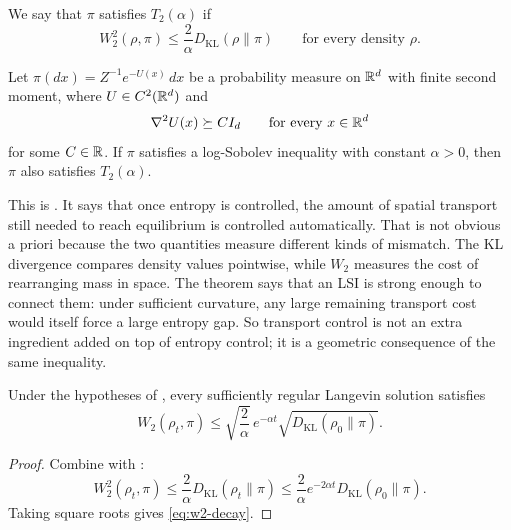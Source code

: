\documentclass[11pt]{article}
\begin{document}
\begin{definition}
\label{def:t2}
We say that $\pi$ satisfies $T_2(\alpha)$ if
\begin{equation}
  W_2^2(\rho,\pi)
  \le
  \frac{2}{\alpha}D_{\mathrm{KL}}(\rho\|\pi)
  \qquad
  \text{for every density }\rho.
  \label{eq:t2}
\end{equation}
\end{definition}

\begin{theorem}
\label{thm:otto-villani}
Let $\pi(dx)=Z^{-1}e^{-U(x)}\,dx$ be a probability measure on $\mathbb{R}^d$ with finite second moment, where $U\in C^2(\mathbb{R}^d)$ and
\[
\nabla^2 U(x)\succeq C I_d
\qquad\text{for every }x\in\mathbb{R}^d
\]
for some $C\in\mathbb{R}$.
If $\pi$ satisfies a log-Sobolev inequality with constant $\alpha>0$, then $\pi$ also satisfies $T_2(\alpha)$.
\end{theorem}

This is \citet[Thm.~1]{otto_villani_2000_talagrand_lsi}.
It says that once entropy is controlled, the amount of spatial transport still needed to reach equilibrium is controlled automatically.
That is not obvious a priori because the two quantities measure different kinds of mismatch.
The KL divergence compares density values pointwise, while $W_2$ measures the cost of rearranging mass in space.
The theorem says that an LSI is strong enough to connect them: under sufficient curvature, any large remaining transport cost would itself force a large entropy gap.
So transport control is not an extra ingredient added on top of entropy control; it is a geometric consequence of the same inequality.

\begin{samepage}
\begin{corollary}
\label{cor:wasserstein-decay}
Under the hypotheses of , every sufficiently regular Langevin solution satisfies
\begin{equation}
  W_2(\rho_t,\pi)
  \le
  \sqrt{\frac{2}{\alpha}}\,
  e^{-\alpha t}
  \sqrt{D_{\mathrm{KL}}(\rho_0\|\pi)}.
  \label{eq:w2-decay}
\end{equation}
\end{corollary}
\end{samepage}

\begin{proof}
Combine  with :
\[
W_2^2(\rho_t,\pi)
\le
\frac{2}{\alpha}D_{\mathrm{KL}}(\rho_t\|\pi)
\le
\frac{2}{\alpha}e^{-2\alpha t}D_{\mathrm{KL}}(\rho_0\|\pi).
\]
Taking square roots gives \eqref{eq:w2-decay}.%
\end{proof}
\end{document}
